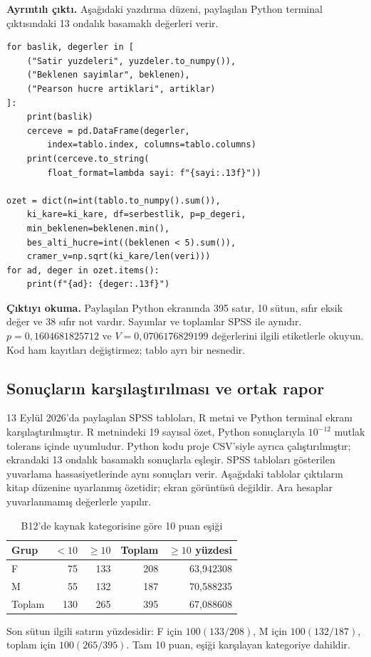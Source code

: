 \par\noindent\begin{minipage}{\linewidth}
\textbf{Ayrıntılı çıktı.} Aşağıdaki yazdırma düzeni, paylaşılan
Python terminal çıktısındaki 13 ondalık basamaklı değerleri verir.

\begin{lstlisting}[style=prismPythonApp]
for baslik, degerler in [
    ("Satir yuzdeleri", yuzdeler.to_numpy()),
    ("Beklenen sayimlar", beklenen),
    ("Pearson hucre artiklari", artiklar)
]:
    print(baslik)
    cerceve = pd.DataFrame(degerler,
        index=tablo.index, columns=tablo.columns)
    print(cerceve.to_string(
        float_format=lambda sayi: f"{sayi:.13f}"))

ozet = dict(n=int(tablo.to_numpy().sum()),
    ki_kare=ki_kare, df=serbestlik, p=p_degeri,
    min_beklenen=beklenen.min(),
    bes_alti_hucre=int((beklenen < 5).sum()),
    cramer_v=np.sqrt(ki_kare/len(veri)))
for ad, deger in ozet.items():
    print(f"{ad}: {deger:.13f}")
\end{lstlisting}

\textbf{Çıktıyı okuma.} Paylaşılan Python ekranında 395 satır,
10 sütun, sıfır eksik değer ve 38 sıfır not vardır. Sayımlar ve
toplamlar SPSS ile aynıdır. $p=0{,}1604681825712$ ve
$V=0{,}0706176829199$ değerlerini ilgili etiketlerle okuyun.
Kod ham kayıtları değiştirmez; tablo ayrı bir nesnedir.
\end{minipage}\par

\subsection{Sonuçların karşılaştırılması ve ortak rapor}
13 Eylül 2026'da paylaşılan SPSS tabloları, R metni ve Python
terminal ekranı karşılaştırılmıştır. R metnindeki 19 sayısal
özet, Python sonuçlarıyla $10^{-12}$ mutlak tolerans içinde
uyumludur. Python kodu proje CSV'siyle ayrıca çalıştırılmıştır;
ekrandaki 13 ondalık basamaklı sonuçlarla eşleşir. SPSS tabloları
gösterilen yuvarlama hassasiyetlerinde aynı sonuçları verir.
Aşağıdaki tablolar çıktıların kitap düzenine uyarlanmış özetidir;
ekran görüntüsü değildir. Ara hesaplar yuvarlanmamış değerlerle yapılır.

\begin{table}[H]
\centering
\caption{B12'de kaynak kategorisine göre 10 puan eşiği}
\label{tab:b12-dogrulanmis-sayim}
\begin{tabular}{@{}lrrrr@{}}
\toprule
Grup & $<10$ & $\geq10$ & Toplam & $\geq10$ yüzdesi \\
\midrule
F & 75 & 133 & 208 & 63,942308 \\
M & 55 & 132 & 187 & 70,588235 \\
\midrule
Toplam & 130 & 265 & 395 & 67,088608 \\
\bottomrule
\end{tabular}
\par\smallskip
{\footnotesize Son sütun ilgili satırın yüzdesidir: F için
$100(133/208)$, M için $100(132/187)$, toplam için $100(265/395)$.
Tam 10 puan, eşiği karşılayan kategoriye dahildir.\par}
\end{table}

